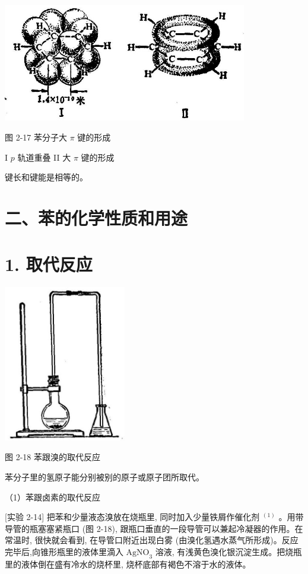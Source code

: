 \documentclass[10pt]{article}
\begin{document}
\begin{center}
\includegraphics[max width=0.8\textwidth]{images/01912d16-be99-77bb-9535-4f3ed8d9946f_86_740017.jpg}
\end{center}

图 2-17 苯分子大 \(\pi\) 键的形成

I \(p\) 轨道重叠 II 大 \(\pi\) 键的形成

键长和键能是相等的。

\section*{二、苯的化学性质和用途}

\section*{1. 取代反应}

\begin{center}
\includegraphics[max width=0.4\textwidth]{images/01912d16-be99-77bb-9535-4f3ed8d9946f_86_274474.jpg}
\end{center}

图 2-18 苯跟溴的取代反应

苯分子里的氢原子能分别被别的原子或原子团所取代。

（1）苯跟卤素的取代反应

[实验 2-14] 把苯和少量液态溴放在烧瓶里, 同时加入少量铁屑作催化剂 \({}^{\left( 1\right) }\) 。用带导管的瓶塞塞紧瓶口 (图 2-18), 跟瓶口垂直的一段导管可以兼起冷凝器的作用。在常温时, 很快就会看到, 在导管口附近出现白雾 (由溴化氢遇水蒸气所形成)。反应完毕后,向锥形瓶里的液体里滴入 \({\mathrm{{AgNO}}}_{3}\) 溶液, 有浅黄色溴化银沉淀生成。把烧瓶里的液体倒在盛有冷水的烧杯里, 烧杯底部有褐色不溶于水的液体。
\end{document}
